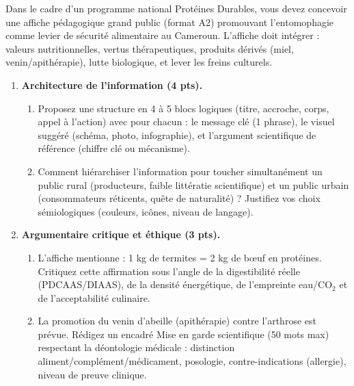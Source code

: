 \documentclass[11pt]{article}
\begin{document}
\begin{exercice}
Dans le cadre d'un programme national \og{}Protéines Durables\fg{}, vous devez concevoir une affiche pédagogique grand public (format A2) promouvant l'entomophagie comme levier de sécurité alimentaire au Cameroun. L'affiche doit intégrer : valeurs nutritionnelles, vertus thérapeutiques, produits dérivés (miel, venin/apithérapie), lutte biologique, et lever les freins culturels.

\begin{enumerate}
\item \textbf{Architecture de l'information (4 pts).} 
      \begin{enumerate}
      \item Proposez une structure en 4 à 5 blocs logiques (titre, accroche, corps, appel à l'action) avec pour chacun : le message clé (1 phrase), le visuel suggéré (schéma, photo, infographie), et l'argument scientifique de référence (chiffre clé ou mécanisme).
      \item Comment hiérarchiser l'information pour toucher simultanément un public rural (producteurs, faible littératie scientifique) et un public urbain (consommateurs réticents, quête de naturalité) ? Justifiez vos choix sémiologiques (couleurs, icônes, niveau de langage).
      \end{enumerate}
\item \textbf{Argumentaire critique et éthique (3 pts).} 
      \begin{enumerate}
      \item L'affiche mentionne : \og{}1 kg de termites = 2 kg de bœuf en protéines\fg{}. Critiquez cette affirmation sous l'angle de la digestibilité réelle (PDCAAS/DIAAS), de la densité énergétique, de l'empreinte eau/CO$_2$ et de l'acceptabilité culinaire.
      \item La promotion du venin d'abeille (apithérapie) contre l'arthrose est prévue. Rédigez un encadré \og{}Mise en garde scientifique\fg{} (50 mots max) respectant la déontologie médicale : distinction aliment/complément/médicament, posologie, contre-indications (allergie), niveau de preuve clinique.
      \end{enumerate}
\end{enumerate}
\end{exercice}
\end{document}
